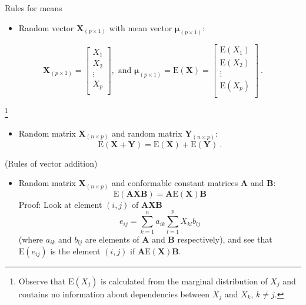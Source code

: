 \documentclass[ignorenonframetext,]{beamer}
\providecommand{\tightlist}{%
  \setlength{\itemsep}{0pt}\setlength{\parskip}{0pt}}
\begin{document}
\begin{frame}

\begin{block}{Rules for means}

\begin{itemize}
\tightlist
\item
  Random vector \(\boldsymbol{X}_{(p\times 1)}\) with mean vector
  \(\boldsymbol{\mu}_{(p\times 1)}\):
\end{itemize}

\[\boldsymbol{X}_{(p\times 1)}=\left[ \begin{array}{c}X_1\\ X_2\\ \vdots\\ X_p\\ \end{array}\right], \text{ and }\boldsymbol{\mu}_{(p \times 1)}=\text{E}(\boldsymbol{X})=\left[ \begin{array}{c}\text{E}(X_1)\\ \text{E}(X_2)\\ \vdots\\ \text{E}(X_p)\\ \end{array}\right] \ .\]

\footnote{Observe that $\text{E}(X_j)$ is calculated from the marginal distribution of $X_j$ and contains no information about dependencies between $X_{j}$ and $X_k$, $k\neq j$.}

\begin{itemize}
\tightlist
\item
  Random matrix \(\boldsymbol{X}_{(n\times p)}\) and random matrix
  \(\boldsymbol{Y}_{(n\times p)}\):
  \[\text{E}(\boldsymbol{X}+\boldsymbol{Y})=\text{E}(\boldsymbol{X})+\text{E}(\boldsymbol{Y}) \ .\]
\end{itemize}

(Rules of vector addition)

\end{block}

\end{frame}

\begin{frame}

\begin{itemize}
\tightlist
\item
  Random matrix \(\boldsymbol{X}_{(n\times p)}\) and conformable
  constant matrices \(\boldsymbol{A}\) and \(\boldsymbol{B}\):
  \[\text{E}(\boldsymbol{A}\boldsymbol{X}\boldsymbol{B})=\boldsymbol{A}\text{E}(\boldsymbol{X})\boldsymbol{B}\]
  Proof: Look at element \((i,j)\) of
  \(\boldsymbol{A}\boldsymbol{X}\boldsymbol{B}\)
  \[e_{ij}=\sum_{k=1}^n a_{ik} \sum_{l=1}^p X_{kl}b_{lj}\] (where
  \(a_{ik}\) and \(b_{lj}\) are elements of \(\boldsymbol{A}\) and
  \(\boldsymbol{B}\) respectively), and see that \(\text{E}(e_{ij})\) is
  the element \((i,j)\) if
  \(\boldsymbol{A}\text{E}(\boldsymbol{X})\boldsymbol{B}\).
\end{itemize}

\end{frame}
\end{document}
